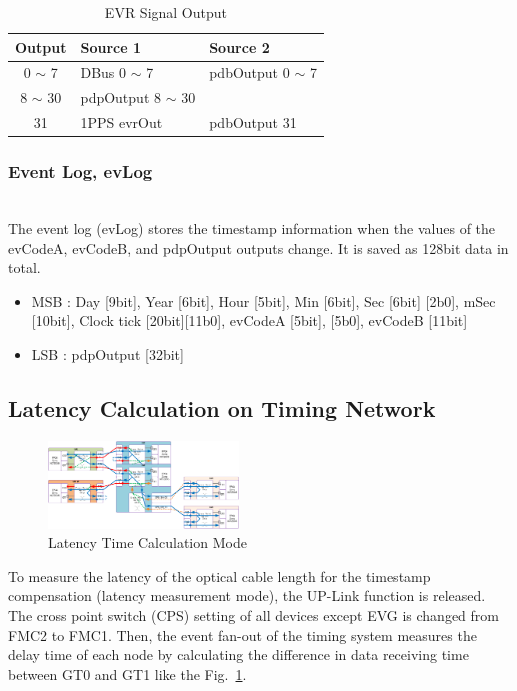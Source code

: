 \documentclass[journal,reqno]{IEEEtran}
\begin{document}
\begin{table}[h!t]
	\centering
	\caption{EVR Signal Output}
	\label{evr_signal_output}
	
	\begin{tabular}{@{}cll@{}}
		
		\hline
		\textbf{Output}	& \textbf{Source 1}				& \textbf{Source 2}\\
		\hline
		0 $\sim$ 7			& DBus 0 $\sim$ 7			& pdbOutput 0 $\sim$ 7\\
		8 $\sim$ 30			& pdpOutput 8 $\sim$ 30     \\
		31				& 1PPS evrOut					& pdbOutput 31\\        								
		\hline
	\end{tabular}
\end{table}

\subsubsection{Event Log, evLog}\hspace*{\fill} \\
The event log (evLog) stores the timestamp information when the values of the evCodeA, evCodeB, and pdpOutput outputs change. It is saved as 128bit data in total.\newline

\begin{itemize}
	\item MSB :	Day [9bit], Year [6bit], Hour [5bit], Min [6bit], Sec [6bit] [2b0], mSec [10bit], Clock tick [20bit][11b0], evCodeA [5bit], [5b0], evCodeB [11bit]
	\item LSB :	pdpOutput [32bit]
\end{itemize}

\subsection{Latency Calculation on Timing Network}
\begin{figure}[!htb]
	\centering
	\includegraphics*[width=0.45\textwidth, height=0.3\textwidth]{img15.png}
	\caption{Latency Time Calculation Mode}
	\label{latency_time_mode}
\end{figure}
To measure the latency of the optical cable length for the timestamp compensation (latency measurement mode), the UP-Link function is released. The cross point switch (CPS) setting of all devices except EVG is changed from FMC2 to FMC1. Then, the event fan-out of the timing system measures the delay time of each node by calculating the difference in data receiving time between GT0 and GT1 like the Fig.~\ref{latency_time_mode}.
\end{document}
